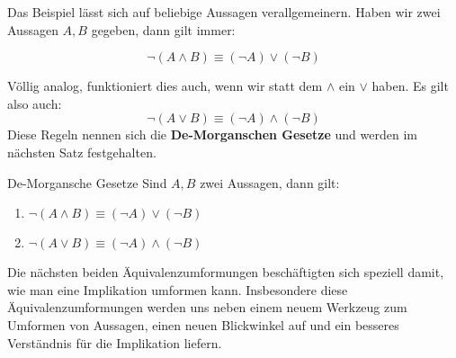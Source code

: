 \documentclass[../../main.tex]{subfiles}
\begin{document}
     Das Beispiel lässt sich auf beliebige Aussagen verallgemeinern. Haben wir zwei Aussagen $A,B$ gegeben, dann gilt immer:
     
     \[\lnot( A \land B) \equiv (\lnot A) \lor (\lnot B)\]
     
     Völlig analog, funktioniert dies auch, wenn wir 
     statt dem $\land$ ein $\lor$ haben. Es gilt also auch:
     \[\lnot( A \lor B) \equiv (\lnot A) \land (\lnot B)\]
      Diese Regeln nennen sich 
     die \textbf{De-Morganschen Gesetze} und werden im nächsten Satz festgehalten.
     
    \begin{lemma}{De-Morgansche Gesetze}
        Sind $A,B$ zwei Aussagen, dann gilt:
        \begin{enumerate}
            \item $\lnot( A \land B) \equiv (\lnot A) \lor (\lnot B)$
            \item $\lnot( A \lor B) \equiv (\lnot A) \land (\lnot B)$
        \end{enumerate}
    \end{lemma}
    
    Die nächsten beiden Äquivalenzumformungen beschäftigten sich speziell damit, wie 
    man eine Implikation umformen kann. Insbesondere diese Äquivalenzumformungen werden
     uns neben
    einem neuem Werkzeug zum Umformen von Aussagen,
    einen neuen
    Blickwinkel auf und ein besseres Verständnis für die Implikation liefern.
    
\end{document}
